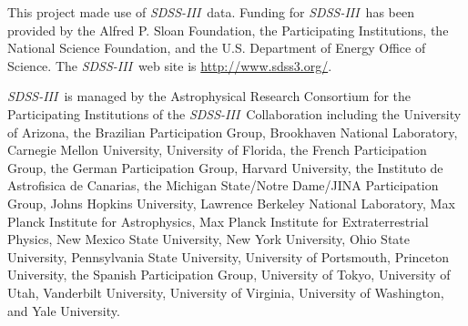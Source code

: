\documentclass[manuscript, letterpaper]{aastex6}
\newcommand{\project}[1]{\textsl{#1}}
\newcommand{\acronym}[1]{{\small{#1}}}
\newcommand{\sdssiii}{\project{\acronym{SDSS-III}}}
\begin{document}
This project made use of \sdssiii\ data. Funding for \sdssiii\ has been
provided by the Alfred P. Sloan Foundation, the Participating Institutions, the
National Science Foundation, and the \acronym{U.S.} Department of Energy Office
of Science. The \sdssiii\ web site is \url{http://www.sdss3.org/}.

\sdssiii\ is managed by the Astrophysical Research Consortium for the
Participating Institutions of the \sdssiii\ Collaboration including the
University of Arizona, the Brazilian Participation Group, Brookhaven National
Laboratory, Carnegie Mellon University, University of Florida, the French
Participation Group, the German Participation Group, Harvard University, the
Instituto de Astrofisica de Canarias, the Michigan State/Notre
Dame/\acronym{JINA} Participation Group, Johns Hopkins University, Lawrence
Berkeley National Laboratory, Max Planck Institute for Astrophysics, Max Planck
Institute for Extraterrestrial Physics, New Mexico State University, New York
University, Ohio State University, Pennsylvania State University, University of
Portsmouth, Princeton University, the Spanish Participation Group, University
of Tokyo, University of Utah, Vanderbilt University, University of Virginia,
University of Washington, and Yale University.




\end{document}
